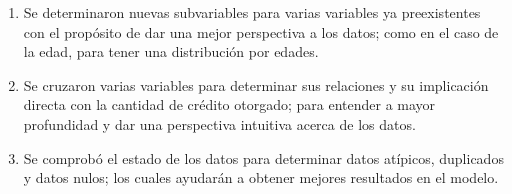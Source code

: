 \begin{enumerate}
	\item Se determinaron nuevas subvariables para varias variables ya preexistentes con el propósito de dar una mejor perspectiva a los datos; como en el caso de la edad, para tener una distribución por edades. 
	\item  Se cruzaron varias variables para determinar sus relaciones y su implicación directa con la cantidad de crédito otorgado; para entender a mayor profundidad y dar una perspectiva intuitiva acerca de los datos. 
	\item Se comprobó el estado de los datos para determinar datos atípicos, duplicados y datos nulos; los cuales ayudarán a obtener mejores resultados en el modelo. 
\end{enumerate}







